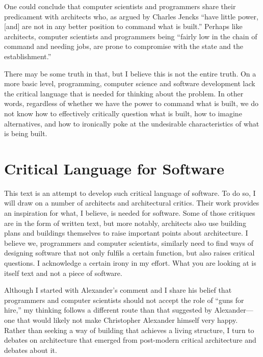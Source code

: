 One could conclude that computer scientists and programmers share their predicament with architects
who, as argued by Charles Jencks
``have little power, [and] are not in any better
position to command what is built.'' Perhaps like architects, computer scientists and programmers
being ``fairly low in the chain of command and needing jobs, are prone to compromise with the
state and the establishment.''

There may be some truth in that, but I believe this is not the entire truth. On a more basic level,
programming, computer science and software development lack the critical language that is needed
for thinking about the problem. In other words, regardless of whether we have the power to command
what is built, we do not know how to effectively critically question what is built, how to imagine
alternatives, and how to ironically poke at the undesirable characteristics of what is being built.

\section{Critical Language for Software}
This text is an attempt to develop such critical language of software. To do so, I will draw on
a number of architects and architectural critics. Their work provides an inspiration for
what, I believe, is needed for software. Some of those critiques are in the form of written text,
but more notably, architects also use building plans and buildings themselves to raise important
points about architecture. I believe we, programmers and computer scientists, similarly need to
find ways of designing software that not only fulfils a certain function, but also raises critical
questions. I acknowledge a certain irony in my effort. What you are looking at is itself text
and not a piece of software.

Although I started with Alexander's comment and I share his belief that programmers and computer
scientists should not accept the role of ``guns for hire,'' my thinking follows a different
route than that suggested by Alexander---one that would likely not make Christopher Alexander
himself very happy.
Rather than seeking a way of building that achieves a living structure, I turn to debates
on architecture that emerged from post-modern critical architecture and debates about it.

